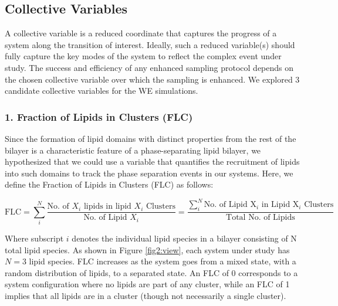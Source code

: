 \documentclass{biophys-new}
\begin{document}
\subsection*{Collective Variables}

A collective variable is a reduced coordinate that captures the progress of a system along the transition of interest.
Ideally, such a reduced variable(s) should fully capture the key modes of the system to reflect the complex event under study.
The success and efficiency of any enhanced sampling protocol depends on the chosen collective variable over which the sampling is enhanced\cite{Valsson2016, Yang2019b, Henin2022}. 
We explored 3 candidate collective variables for the WE simulations.

\subsubsection*{1. Fraction of Lipids in Clusters (FLC)}
Since the formation of lipid domains with distinct properties from the rest of the bilayer is a characteristic feature of a phase-separating lipid bilayer,
we hypothesized that we could use a variable that quantifies the recruitment of lipids into such domains to track the phase separation events in our systems.
Here, we define the Fraction of Lipids in Clusters (FLC) as follows:

\begin{equation}
\label{eq:FLC}
\text{FLC} = \sum_{i}^{N} \frac{\text{No. of $X_i$ lipids in lipid $X_i$ Clusters}}{\text{No. of Lipid $X_i$}} =  \frac{\sum_{i}^{N} \text{No. of Lipid X$_i$ in Lipid X$_i$ Clusters}}{\text{Total No. of Lipids}}
\end{equation}

\noindent Where subscript $i$ denotes the individual lipid species in a bilayer consisting of N total lipid species.
As shown in Figure \ref{fig2:view}, each system under study has $N=3$ lipid species.
FLC increases as the system goes from a mixed state, with a random distribution of lipids, to a separated state.
An FLC of 0 corresponds to a system configuration where no lipids are part of any cluster,
while an FLC of 1 implies that all lipids are in a cluster (though not necessarily a single cluster).
\end{document}
